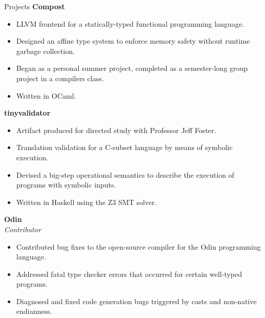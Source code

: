 \documentclass{resume} %
\begin{document}
\begin{rSection}{Projects}
{\bf Compost}
\begin{itemize}
    \item LLVM frontend for a statically-typed functional programming language.
    \item Designed an affine type system to enforce memory safety without runtime garbage collection.
    \item Began as a personal summer project, completed as a semester-long group project in a compilers class.
    \item Written in OCaml.
\end{itemize}
{\bf tinyvalidator} 
\begin{itemize}
    \item Artifact produced for directed study with Professor Jeff Foster.
    \item Translation validation for a C-subset language by means of symbolic execution.
    \item Devised a big-step operational semantics to describe the execution of programs with symbolic inputs.
    \item Written in Haskell using the Z3 SMT solver.
\end{itemize}
{\bf Odin } \\
{\it Contributor}
\begin{itemize}
    \item Contributed bug fixes to the open-source compiler for the Odin programming language.
    \item Addressed fatal type checker errors that occurred for certain well-typed programs.
    \item Diagnosed and fixed code generation bugs triggered by casts and non-native endianness.
\end{itemize}
\end{rSection}
\end{document}
